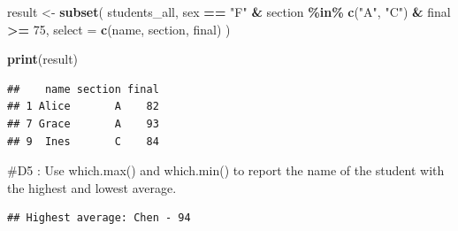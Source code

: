 \documentclass[
]{article}
\newenvironment{Shaded}{\begin{snugshade}}{\end{snugshade}}
\newcommand{\AttributeTok}[1]{\textcolor[rgb]{0.13,0.29,0.53}{#1}}
\newcommand{\DecValTok}[1]{\textcolor[rgb]{0.00,0.00,0.81}{#1}}
\newcommand{\FunctionTok}[1]{\textcolor[rgb]{0.13,0.29,0.53}{\textbf{#1}}}
\newcommand{\NormalTok}[1]{#1}
\newcommand{\OtherTok}[1]{\textcolor[rgb]{0.56,0.35,0.01}{#1}}
\newcommand{\SpecialCharTok}[1]{\textcolor[rgb]{0.81,0.36,0.00}{\textbf{#1}}}
\newcommand{\StringTok}[1]{\textcolor[rgb]{0.31,0.60,0.02}{#1}}
\begin{document}
\begin{Shaded}
\begin{Highlighting}[]
\NormalTok{result }\OtherTok{\textless{}{-}} \FunctionTok{subset}\NormalTok{(}
\NormalTok{  students\_all,}
\NormalTok{  sex }\SpecialCharTok{==} \StringTok{"F"} \SpecialCharTok{\&}
\NormalTok{  section }\SpecialCharTok{\%in\%} \FunctionTok{c}\NormalTok{(}\StringTok{"A"}\NormalTok{, }\StringTok{"C"}\NormalTok{) }\SpecialCharTok{\&}
\NormalTok{  final }\SpecialCharTok{\textgreater{}=} \DecValTok{75}\NormalTok{,}
  \AttributeTok{select =} \FunctionTok{c}\NormalTok{(name, section, final)}
\NormalTok{)}

\FunctionTok{print}\NormalTok{(result)}
\end{Highlighting}
\end{Shaded}

\begin{verbatim}
##    name section final
## 1 Alice       A    82
## 7 Grace       A    93
## 9  Ines       C    84
\end{verbatim}

\#D5 : Use which.max() and which.min() to report the name of the student
with the highest and lowest average.

\begin{Shaded}
\end{Shaded}

\begin{verbatim}
## Highest average: Chen - 94
\end{verbatim}

\begin{Shaded}
\end{Shaded}
\end{document}
